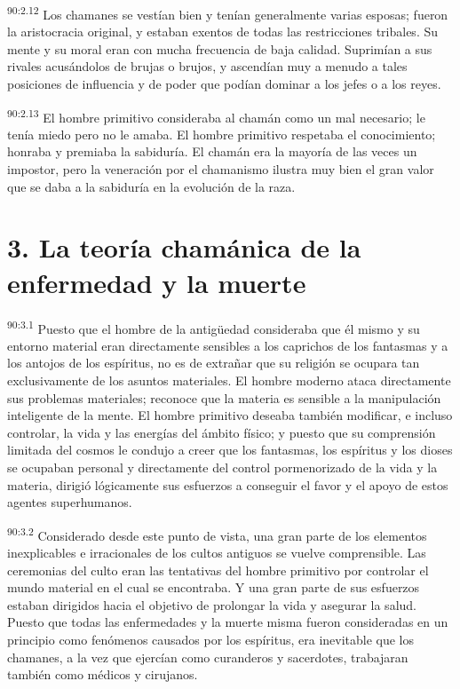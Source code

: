 \documentclass[twoside, 11pt]{book}
\begin{document}
\par
\textsuperscript{90:2.12} Los chamanes se vestían bien y tenían generalmente varias esposas; fueron la aristocracia original, y estaban exentos de todas las restricciones tribales. Su mente y su moral eran con mucha frecuencia de baja calidad. Suprimían a sus rivales acusándolos de brujas o brujos, y ascendían muy a menudo a tales posiciones de influencia y de poder que podían dominar a los jefes o a los reyes.

\par
\textsuperscript{90:2.13} El hombre primitivo consideraba al chamán como un mal necesario; le tenía miedo pero no le amaba. El hombre primitivo respetaba el conocimiento; honraba y premiaba la sabiduría. El chamán era la mayoría de las veces un impostor, pero la veneración por el chamanismo ilustra muy bien el gran valor que se daba a la sabiduría en la evolución de la raza.

\section*{3. La teoría chamánica de la enfermedad y la muerte}
\par
\textsuperscript{90:3.1} Puesto que el hombre de la antig\"uedad consideraba que él mismo y su entorno material eran directamente sensibles a los caprichos de los fantasmas y a los antojos de los espíritus, no es de extrañar que su religión se ocupara tan exclusivamente de los asuntos materiales. El hombre moderno ataca directamente sus problemas materiales; reconoce que la materia es sensible a la manipulación inteligente de la mente. El hombre primitivo deseaba también modificar, e incluso controlar, la vida y las energías del ámbito físico; y puesto que su comprensión limitada del cosmos le condujo a creer que los fantasmas, los espíritus y los dioses se ocupaban personal y directamente del control pormenorizado de la vida y la materia, dirigió lógicamente sus esfuerzos a conseguir el favor y el apoyo de estos agentes superhumanos.

\par
\textsuperscript{90:3.2} Considerado desde este punto de vista, una gran parte de los elementos inexplicables e irracionales de los cultos antiguos se vuelve comprensible. Las ceremonias del culto eran las tentativas del hombre primitivo por controlar el mundo material en el cual se encontraba. Y una gran parte de sus esfuerzos estaban dirigidos hacia el objetivo de prolongar la vida y asegurar la salud. Puesto que todas las enfermedades y la muerte misma fueron consideradas en un principio como fenómenos causados por los espíritus, era inevitable que los chamanes, a la vez que ejercían como curanderos y sacerdotes, trabajaran también como médicos y cirujanos.
\end{document}
